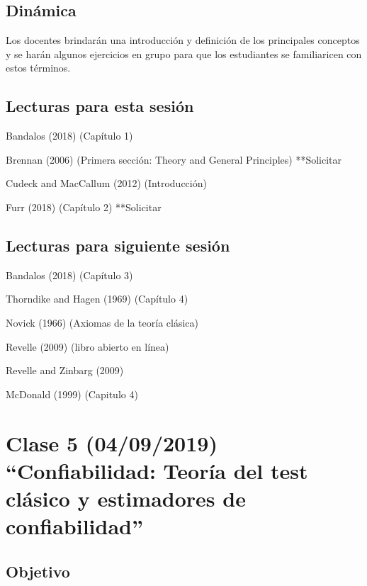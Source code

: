 \documentclass[11pt,]{article}
\begin{document}
\hypertarget{dinamica-3}{%
\subsection{Dinámica}\label{dinamica-3}}

Los docentes brindarán una introducción y definición de los principales
conceptos y se harán algunos ejercicios en grupo para que los
estudiantes se familiaricen con estos términos.

\hypertarget{lecturas-para-esta-sesion-2}{%
\subsection{Lecturas para esta
sesión}\label{lecturas-para-esta-sesion-2}}

Bandalos (2018) (Capítulo 1)

Brennan (2006) (Primera sección: Theory and General Principles)
**Solicitar

Cudeck and MacCallum (2012) (Introducción)

Furr (2018) (Capítulo 2) **Solicitar

\hypertarget{lecturas-para-siguiente-sesion-2}{%
\subsection{Lecturas para siguiente
sesión}\label{lecturas-para-siguiente-sesion-2}}

Bandalos (2018) (Capítulo 3)

Thorndike and Hagen (1969) (Capítulo 4)

Novick (1966) (Axiomas de la teoría clásica)

Revelle (2009) (libro abierto en línea)

Revelle and Zinbarg (2009)

McDonald (1999) (Capitulo 4)

\hypertarget{clase-5-04092019-confiabilidad-teoria-del-test-clasico-y-estimadores-de-confiabilidad}{%
\section{Clase 5 (04/09/2019) ``Confiabilidad: Teoría del test clásico y
estimadores de
confiabilidad''}\label{clase-5-04092019-confiabilidad-teoria-del-test-clasico-y-estimadores-de-confiabilidad}}

\hypertarget{objetivo-4}{%
\subsection{Objetivo}\label{objetivo-4}}
\end{document}
